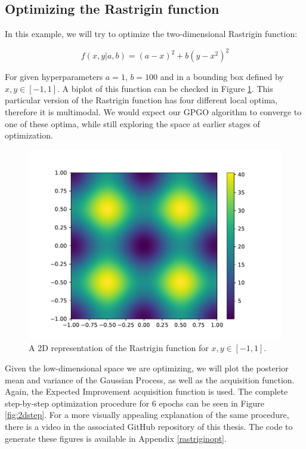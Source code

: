 \documentclass[10pt,a4paper,twoside]{book}
\begin{document}
\subsection{Optimizing the Rastrigin function}

In this example, we will try to optimize the two-dimensional Rastrigin function:

\begin{equation}
f(x, y| a, b) = (a - x)^2 + b(y - x^2)^2
\end{equation}

For given hyperparameters $a=1,\, b=100$ and in a bounding box defined by $x,y \in [-1, 1]$. A biplot of this function can be checked in Figure \ref{fig:rosen}. This particular version of the Rastrigin function has four different local optima, therefore it is multimodal. We would expect our GPGO algorithm to converge to one of these optima, while still exploring the space at earlier stages of optimization.\\

\begin{figure}
	\centering
	\caption{A 2D representation of the Rastrigin function for $x, y \in [-1, 1]$.}
	\label{fig:rosen}
	\includegraphics[scale=0.5]{figures/chapter3/rosen/rosen}
\end{figure}

Given the low-dimensional space we are optimizing, we will plot the posterior mean and variance of the Gaussian Process, as well as the acquisition function. Again, the Expected Improvement acquisition function is used. The complete step-by-step optimization procedure for 6 epochs can be seen in Figure \ref{fig:2dstep}. For a more visually appealing explanation of the same procedure, there is a video in the associated GitHub repository of this thesis. The code to generate these figures is available in Appendix \ref{rastriginopt}.\\
\end{document}
